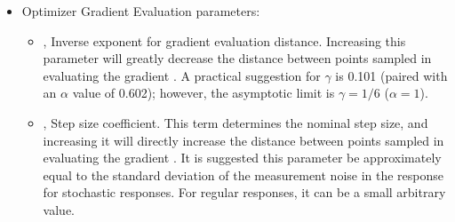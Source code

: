 \begin{itemize}
\begin{itemize}
  \item Optimizer Gradient Evaluation parameters:
    \begin{itemize}
      \item {},  Inverse exponent for gradient evaluation distance. Increasing this
        parameter will greatly decrease the distance between points sampled in evaluating the gradient
        \cite{spall1998implementation}. A practical suggestion for $\gamma$ is 0.101 (paired with an
        $\alpha$ value of 0.602); however, the asymptotic limit is $\gamma=1/6$ ($\alpha=1$). 
      \item {},  Step size coefficient.  This term determines the
        nominal step size, and increasing it will directly increase the distance between points sampled in evaluating the gradient
        \cite{spall1998implementation}. It is suggested this parameter be approximately equal to the standard
        deviation of the measurement noise in the response for stochastic responses.  For regular responses,
        it can be a small arbitrary value. 
    \end{itemize}


\end{itemize}
\end{itemize}
